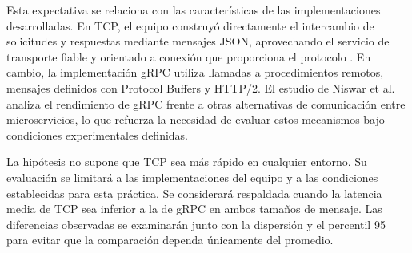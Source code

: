 Esta expectativa se relaciona con las características
de las implementaciones desarrolladas. En TCP, el
equipo construyó directamente el intercambio de
solicitudes y respuestas mediante mensajes JSON,
aprovechando el servicio de transporte fiable y
orientado a conexión que proporciona el protocolo
\cite{eddy2022tcp}. En cambio, la implementación
gRPC utiliza llamadas a procedimientos remotos,
mensajes definidos con Protocol Buffers y HTTP/2.
El estudio de Niswar et al. \cite{niswar2024grpc}
analiza el rendimiento de gRPC frente a otras
alternativas de comunicación entre microservicios,
lo que refuerza la necesidad de evaluar estos
mecanismos bajo condiciones experimentales
definidas.

La hipótesis no supone que TCP sea más rápido en
cualquier entorno. Su evaluación se limitará a las
implementaciones del equipo y a las condiciones
establecidas para esta práctica. Se considerará
respaldada cuando la latencia media de TCP sea
inferior a la de gRPC en ambos tamaños de mensaje.
Las diferencias observadas se examinarán junto
con la dispersión y el percentil 95 para evitar
que la comparación dependa únicamente del promedio.
